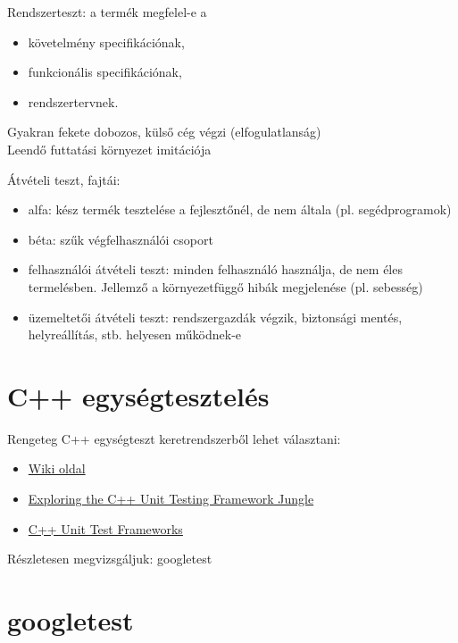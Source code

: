 \documentclass[usenames,dvipsnames,aspectratio=169]{beamer}
\newcommand{\hiv}[1]{{\color{hivatkozasszin}#1}}
\begin{document}
\begin{frame}
  Rendszerteszt: a termék megfelel-e a
  \begin{itemize}
    \item követelmény specifikációnak,
    \item funkcionális specifikációnak,
    \item rendszertervnek.
  \end{itemize}
  Gyakran fekete dobozos, külső cég végzi (elfogulatlanság)\\
  Leendő futtatási környezet imitációja
\end{frame}

\begin{frame}
  Átvételi teszt, fajtái:
  \begin{itemize}
    \item alfa: kész termék tesztelése a fejlesztőnél, de nem általa (pl. segédprogramok)
    \item béta: szűk végfelhasználói csoport
    \item felhasználói átvételi teszt: minden felhasználó használja, de nem éles termelésben. Jellemző a környezetfüggő hibák 
megjelenése (pl. sebesség)
    \item üzemeltetői átvételi teszt: rendszergazdák végzik, biztonsági mentés, helyreállítás, stb. helyesen működnek-e
  \end{itemize}
\end{frame}

\section{C++ egységtesztelés}

\begin{frame}
  Rengeteg C++ egységteszt keretrendszerből lehet választani:
  \begin{itemize}
    \item \hiv{\href{https://en.wikipedia.org/wiki/List\_of\_unit\_testing\_frameworks\#C++}{Wiki oldal}}
    \item \hiv{\href{http://gamesfromwithin.com/exploring-the-c-unit-testing-framework-jungle}%
      {Exploring the C++ Unit Testing Framework Jungle}}
    \item \hiv{\href{https://accu.org/index.php/journals/1326}{C++ Unit Test Frameworks}}
  \end{itemize}
  \vfill
  Részletesen megvizsgáljuk: googletest
\end{frame}

\section{googletest}
\end{document}
